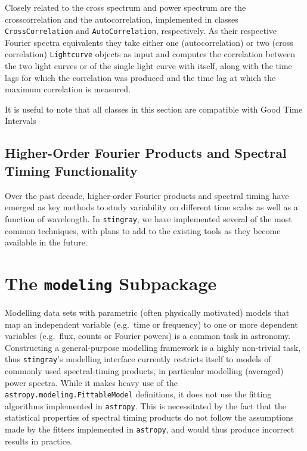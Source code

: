 \documentclass[12pt]{emulateapj}
\newcommand{\stingray}{\texttt{stingray}\xspace}
\newcommand{\lightcurve}{\texttt{Lightcurve}\xspace}
\begin{document}
Closely related to the cross spectrum and power spectrum are the crosscorrelation and the autocorrelation, implemented in classes \texttt{CrossCorrelation} and \texttt{AutoCorrelation}, respectively. As their respective Fourier spectra equivalents they take either one (autocorrelation) or two (cross correlation) \lightcurve objects as input and computes the correlation between the two light curves or of the single light curve with itself, along with the time lags for which the correlation was produced and the time lag at which the maximum correlation is measured.

It is useful to note that all classes in this section are compatible with Good Time Intervals





\subsection{Higher-Order Fourier Products and Spectral Timing Functionality}
\label{sec:fourier_others}

Over the past decade, higher-order Fourier products and spectral timing have emerged as key methods to study variability on different time scales as well as a function of wavelength. In \stingray, we have implemented several of the most common techniques, with plans to add to the existing tools as they become available in the future.


\section{The \texttt{modeling} Subpackage}
\label{sec:modeling}

Modelling data sets with parametric (often physically motivated) models that map an independent variable (e.g.\ time or frequency) to one or more dependent variables (e.g.\ flux, counts or Fourier powers) is a common task in astronomy. Constructing a general-purpose modelling framework is a highly non-trivial task, thus \stingray's modelling interface currently restricts itself to models of commonly used spectral-timing products, in particular modelling (averaged) power spectra. 
While it makes heavy use of the \verb|astropy.modeling.FittableModel| definitions, it does not use the fitting algorithms implemented in \texttt{astropy}. This is necessitated by the fact that the statistical properties of spectral timing products do not follow the assumptions made by the fitters implemented in \texttt{astropy}, and would thus produce incorrect results in practice.
\end{document}
